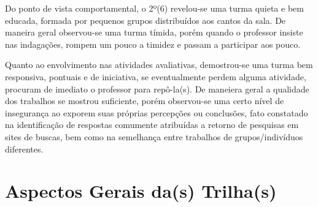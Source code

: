 Do ponto de vista comportamental, o 2º(6) revelou-se uma turma quieta e bem educada, formada por pequenos grupos distribuídos aos cantos da sala. De maneira geral observou-se uma turma tímida, porém quando o professor insiste nas indagações, rompem um pouco a timidez e passam a participar aos pouco.

Quanto ao envolvimento nas atividades avaliativas, demostrou-se uma turma bem responsiva, pontuais e de iniciativa, se eventualmente perdem alguma atividade, procuram de imediato o professor para repô-la(s). De maneiera geral a qualidade dos trabalhos se mostrou suficiente, porém observou-se uma certo nível de insegurança ao exporem suas próprias percepções ou conclusões, fato constatado na identificação de respostas comumente atribuídas a retorno de pesquisas em sites de buscas, bem como na semelhança entre trabalhos de grupos/indivíduos diferentes.

\section{Aspectos Gerais da(s) Trilha(s)} %
\label{sec:Aspectos Gerais da Trilha}
\cite{CADORI:2022}

